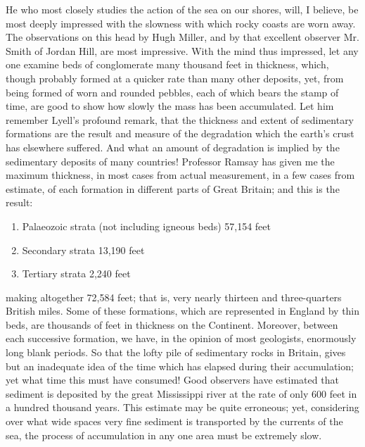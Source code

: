 \indent He who most closely studies the action of the sea on our shores, will, I believe, be most deeply impressed with the slowness with which rocky coasts are worn away. The observations on this head by Hugh Miller, and by that excellent observer Mr. Smith of Jordan Hill, are most impressive. With the mind thus impressed, let any one examine beds of conglomerate many thousand feet in thickness, which, though probably formed at a quicker rate than many other deposits, yet, from being formed of worn and rounded pebbles, each of which bears the stamp of time, are good to show how slowly the mass has been accumulated. Let him remember Lyell's profound remark, that the thickness and extent of sedimentary formations are the result and measure of the degradation which the earth's crust has elsewhere suffered. And what an amount of degradation is implied by the sedimentary deposits of many countries! Professor Ramsay has given me the maximum thickness, in most cases from actual measurement, in a few cases from estimate, of each formation in different parts of Great Britain; and this is the result:
	\begin{enumerate}
		\item Palaeozoic strata (not including igneous beds) 57,154 feet
		\item Secondary strata 13,190 feet
		\item Tertiary strata 2,240 feet
	\end{enumerate}
	making altogether 72,584 feet; that is, very nearly thirteen and three-quarters British miles. Some of these formations, which are represented in England by thin beds, are thousands of feet in thickness on the Continent.  Moreover, between each successive formation, we have, in the opinion of most geologists, enormously long blank periods.  So that the lofty pile of sedimentary rocks in Britain, gives but an inadequate idea of the time which has elapsed during their accumulation; yet what time this must have consumed! Good observers have estimated that sediment is deposited by the great Mississippi river at the rate of only 600 feet in a hundred thousand years. This estimate may be quite erroneous; yet, considering over what wide spaces very fine sediment is transported by the currents of the sea, the process of accumulation in any one area must be extremely slow.\\
